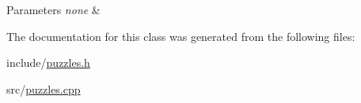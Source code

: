 \begin{DoxyParams}{Parameters}
{\em none} & \\
\hline
\end{DoxyParams}


The documentation for this class was generated from the following files\-:\begin{DoxyCompactItemize}
\item 
include/\hyperlink{puzzles_8h}{puzzles.\-h}\item 
src/\hyperlink{puzzles_8cpp}{puzzles.\-cpp}\end{DoxyCompactItemize}
